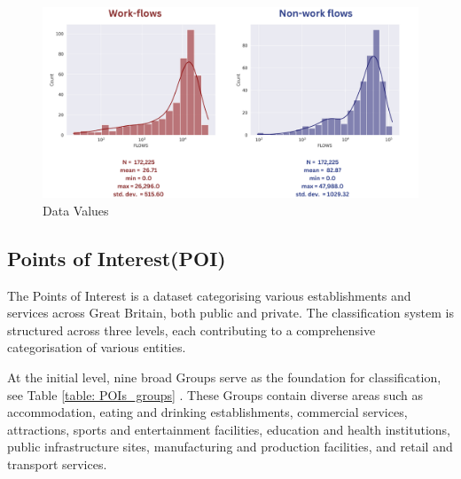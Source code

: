     \begin{figure}[H]
        \centering
        \includegraphics[width=15cm]{Images/Data_values_overview.png}
        \caption{Data Values}
        \label{fig: Data Values Overview}
    \end{figure}

 
        \subsection{Points of Interest(POI)} 

        The Points of Interest is a dataset categorising various establishments and services across Great Britain, both public and private. The classification system is structured across three levels, each contributing to a comprehensive categorisation of various entities\citep{osPointsInterestClassification2022}.
        
        At the initial level, nine broad Groups serve as the foundation for classification, see Table \ref{table: POIs_groups} . These Groups contain diverse areas such as accommodation, eating and drinking establishments, commercial services, attractions, sports and entertainment facilities, education and health institutions, public infrastructure sites, manufacturing and production facilities, and retail and transport services.

